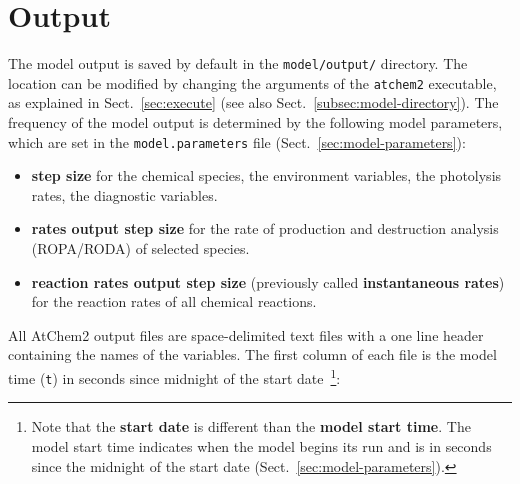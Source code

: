 \section{Output} \label{sec:output}

The model output is saved by default in the \texttt{model/output/}
directory. The location can be modified by changing the arguments of
the \texttt{atchem2} executable, as explained in
Sect.~\ref{sec:execute} (see also Sect.~\ref{subsec:model-directory}).
The frequency of the model output is determined by the following model
parameters, which are set in the \texttt{model.parameters} file
(Sect.~\ref{sec:model-parameters}):

\begin{itemize}
\item \textbf{step size} for the chemical species, the environment
  variables, the photolysis rates, the diagnostic variables.
\item \textbf{rates output step size} for the rate of production and
  destruction analysis (ROPA/RODA) of selected species.
\item \textbf{reaction rates output step size} (previously called
  \textbf{instantaneous rates}) for the reaction rates of all chemical
  reactions.
\end{itemize}

All AtChem2 output files are space-delimited text files with a one
line header containing the names of the variables. The first column of
each file is the model time (\texttt{t}) in seconds since midnight of
the start date~\footnote{Note that the \textbf{start date} is
  different than the \textbf{model start time}. The model start time
  indicates when the model begins its run and is in seconds since the
  midnight of the start date (Sect.~\ref{sec:model-parameters}).}:

